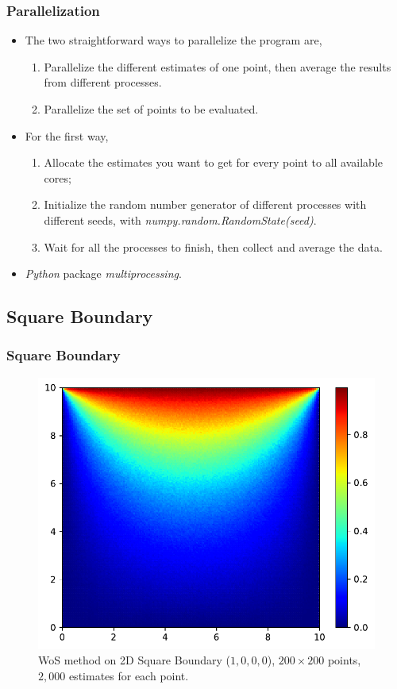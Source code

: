 \documentclass{beamer}
\begin{document}
\begin{frame}
\frametitle{Parallelization}
\begin{itemize}
\item The two straightforward ways to parallelize the program are,
\begin{enumerate}
    \item Parallelize the different estimates of one point, then average the results from different processes.
    \item Parallelize the set of points to be evaluated.
\end{enumerate}
\item For the first way,
\begin{enumerate}
    \item Allocate the estimates you want to get for every point to all available cores;
    \item Initialize the random number generator of different processes with different seeds, with \emph{numpy.random.RandomState(seed)}.
    \item Wait for all the processes to finish, then collect and average the data.
\end{enumerate}
\item \emph{Python} package \emph{multiprocessing}.
\end{itemize}
\end{frame}


\subsection{Square Boundary}

\begin{frame}
\frametitle{Square Boundary}
\begin{figure}[htbp]
    \centering
    \includegraphics[width=.7\textwidth]{./figs/wos_s}
    \caption{\label{fig:wos_s} WoS method on 2D Square Boundary ($1,0,0,0$), $200\times 200$ points, $2,000$ estimates for each point.}
\end{figure}
\end{frame}
\end{document}
